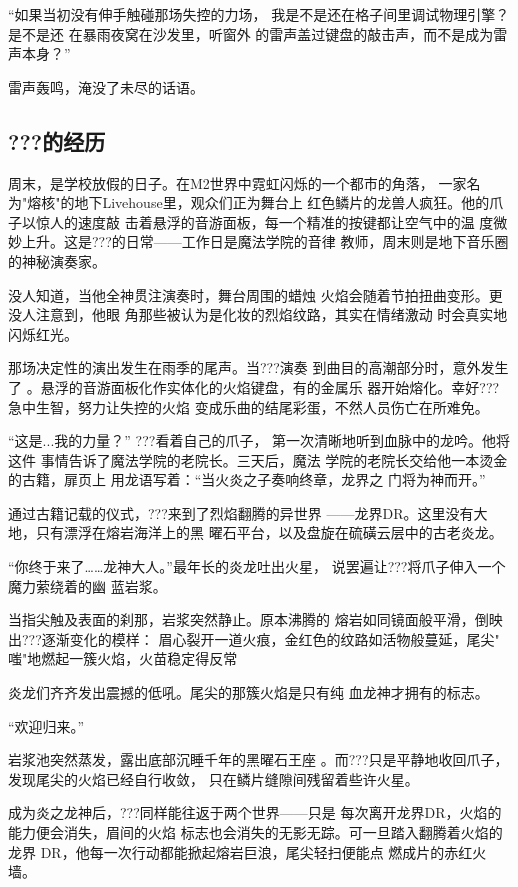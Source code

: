\documentclass[lang=cn,newtx,10pt,scheme=chinese]{elegantbook}
\newcommand{\dr}{???}
\begin{document}
“如果当初没有伸手触碰那场失控的力场，
我是不是还在格子间里调试物理引擎？是不是还
在暴雨夜窝在沙发里，听窗外
的雷声盖过键盘的敲击声，而不是成为雷声本身？”

雷声轰鸣，淹没了未尽的话语。

\subsection{\dr{}的经历}
周末，是学校放假的日子。在M2世界中霓虹闪烁的一个都市的角落，
一家名为"熔核"的地下Livehouse里，观众们正为舞台上
红色鳞片的龙兽人疯狂。他的爪子以惊人的速度敲
击着悬浮的音游面板，每一个精准的按键都让空气中的温
度微妙上升。这是\dr{}的日常——工作日是魔法学院的音律
教师，周末则是地下音乐圈的神秘演奏家。

没人知道，当他全神贯注演奏时，舞台周围的蜡烛
火焰会随着节拍扭曲变形。更没人注意到，他眼
角那些被认为是化妆的烈焰纹路，其实在情绪激动
时会真实地闪烁红光。

那场决定性的演出发生在雨季的尾声。当\dr{}演奏
到曲目的高潮部分时，意外发生了
。悬浮的音游面板化作实体化的火焰键盘，有的金属乐
器开始熔化。幸好\dr{}急中生智，努力让失控的火焰
变成乐曲的结尾彩蛋，不然人员伤亡在所难免。

“这是...我的力量？” \dr{}看着自己的爪子，
第一次清晰地听到血脉中的龙吟。他将这件
事情告诉了魔法学院的老院长。三天后，魔法
学院的老院长交给他一本烫金的古籍，扉页上
用龙语写着：“当火炎之子奏响终章，龙界之
门将为神而开。”

通过古籍记载的仪式，\dr{}来到了烈焰翻腾的异世界
——龙界DR。这里没有大地，只有漂浮在熔岩海洋上的黑
曜石平台，以及盘旋在硫磺云层中的古老炎龙。

“你终于来了……龙神大人。”最年长的炎龙吐出火星，
说罢遍让\dr{}将爪子伸入一个魔力萦绕着的幽
蓝岩浆。

当指尖触及表面的刹那，岩浆突然静止。原本沸腾的
熔岩如同镜面般平滑，倒映出\dr{}逐渐变化的模样：
眉心裂开一道火痕，金红色的纹路如活物般蔓延，尾尖"
嗤"地燃起一簇火焰，火苗稳定得反常

炎龙们齐齐发出震撼的低吼。尾尖的那簇火焰是只有纯
血龙神才拥有的标志。

“欢迎归来。”

岩浆池突然蒸发，露出底部沉睡千年的黑曜石王座
。而\dr{}只是平静地收回爪子，
发现尾尖的火焰已经自行收敛，
只在鳞片缝隙间残留着些许火星。

成为炎之龙神后，\dr{}同样能往返于两个世界——只是
每次离开龙界DR，火焰的能力便会消失，眉间的火焰
标志也会消失的无影无踪。可一旦踏入翻腾着火焰的龙界
DR，他每一次行动都能掀起熔岩巨浪，尾尖轻扫便能点
燃成片的赤红火墙。
\end{document}

